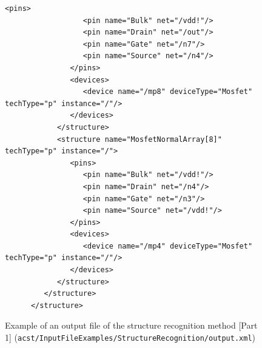 \begin{figure}[H]
\begin{lstlisting}[basicstyle=\ttfamily\scriptsize,backgroundcolor={\color{gray!30}}, escapechar=? ]
               <pins>
                  <pin name="Bulk" net="/vdd!"/>
                  <pin name="Drain" net="/out"/>
                  <pin name="Gate" net="/n7"/>
                  <pin name="Source" net="/n4"/>
               </pins>
               <devices>
                  <device name="/mp8" deviceType="Mosfet" techType="p" instance="/"/>
               </devices>
            </structure>
            <structure name="MosfetNormalArray[8]" techType="p" instance="/">
               <pins>
                  <pin name="Bulk" net="/vdd!"/>
                  <pin name="Drain" net="/n4"/>
                  <pin name="Gate" net="/n3"/>
                  <pin name="Source" net="/vdd!"/>
               </pins>
               <devices>
                  <device name="/mp4" deviceType="Mosfet" techType="p" instance="/"/>
               </devices>
            </structure>
         </structure>
      </structure>
	\end{lstlisting}
	\caption{Example of an output file of the structure recognition method [Part 1] ({\tt acst/InputFileExamples/StructureRecognition/output.xml})}
\end{figure}

